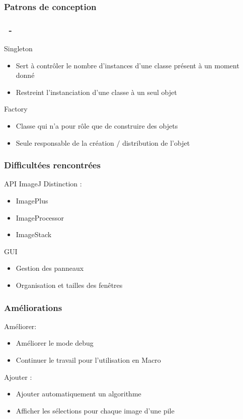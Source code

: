 \documentclass[11pt]{beamer}
\begin{document}
\subsubsection*{Patrons de conception}
\begin{frame}
\frametitle{\subsecname ~- \subsubsecname}
	\begin{block}{Singleton}
		\begin{itemize}
			\item Sert à contrôler le nombre d'instances d'une classe présent à un moment donné
			\item Restreint l'instanciation d'une classe à un seul objet
		\end{itemize}
	\end{block}
	\begin{block}{Factory}
		\begin{itemize}
			\item Classe qui n'a pour rôle que de construire des objets
			\item Seule responsable de la création $/$ distribution de l’objet
		\end{itemize}
	\end{block}
\end{frame}
\begin{frame}
\frametitle{Difficultées rencontrées}
	\begin{block}{API ImageJ}
	Distinction :
		\begin{itemize}
			\item ImagePlus
			\item ImageProcessor
			\item ImageStack
		\end{itemize}
	\end{block}
	\begin{block}{GUI}
		\begin{itemize}
			\item Gestion des panneaux
			\item Organisation et tailles des fenêtres
		\end{itemize}
	\end{block}
\end{frame}
\begin{frame}
\frametitle{Améliorations}
	\begin{block}{Améliorer:}
		\begin{itemize}
			\item Améliorer le mode debug
			\item Continuer le travail pour l'utilisation en Macro
		\end{itemize}
	\end{block}
	\begin{block}{Ajouter :}
		\begin{itemize}
			\item Ajouter automatiquement un algorithme
			\item Afficher les sélections pour chaque image d'une pile
		\end{itemize}
	\end{block}
\end{frame}
\end{document}
